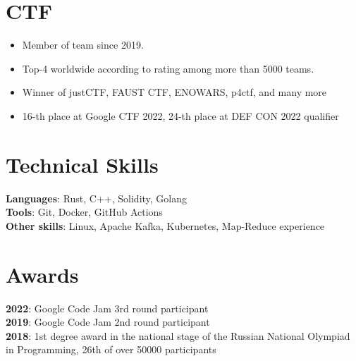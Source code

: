 \documentclass[letterpaper,11pt]{article}
\begin{document}
\section {CTF}
\begin{itemize}[leftmargin=0.15in]
  \setlength\itemsep{-5px}
  \item Member of \href{https://ctftime.org/team/83435}{\color{blue}{C4T BuT S4D}} team since 2019.
  \item Top-4 worldwide according to \href{https://ctftime.org}{\color{blue}{ctftime}} rating among more than 5000 teams.
  \item Winner of justCTF, FAUST CTF, ENOWARS, p4ctf, and many more
  \item 16-th place at Google CTF 2022, 24-th place at DEF CON 2022 qualifier
\end{itemize}

\section{Technical Skills}
 \begin{itemize}[leftmargin=0.15in, label={}]
    \small{\item{
     \textbf{Languages}{: Rust, C++, Solidity, Golang} \\
     \textbf{Tools}{: Git, Docker, GitHub Actions} \\
     \textbf{Other skills}{: Linux, Apache Kafka, Kubernetes, Map-Reduce experience}
    }}
 \end{itemize}

\section{Awards}
 \begin{itemize}[leftmargin=0.15in, label={}]
    \small{\item{
    \textbf{2022}{: Google Code Jam 3rd round participant} \\
    \textbf{2019}{: Google Code Jam 2nd round participant} \\
    \textbf{2018}{: 1st degree award in the national stage of the Russian National Olympiad in Programming, 26th of over 50000 participants} \\
    }}
 \end{itemize}


\end{document}
